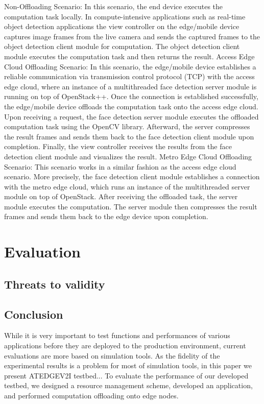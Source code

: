\documentclass[conference]{IEEEtran}
\begin{document}
Non-Offloading Scenario: In this scenario, the end device executes the computation task locally. In compute-intensive applications such as real-time object detection applications the view 
controller on the edge/mobile device captures image frames from the live camera and sends the captured frames to the object detection client module for computation. The object detection client module executes the computation task and then returns the result. 
Access Edge Cloud Offloading Scenario: In this scenario, the edge/mobile device establishes a 
reliable communication via transmission control protocol (TCP) with the access edge cloud, where 
an instance of a multithreaded face detection 
server module is running on top of OpenStack++. 
Once the connection is established successfully, 
the edge/mobile device offloads the computation 
task onto the access edge cloud. Upon receiving a request, the face detection server module 
executes the offloaded computation task using 
the OpenCV library. Afterward, the server compresses the result frames and sends them back 
to the face detection client module upon completion. Finally, the view controller receives the 
results from the face detection client module and 
visualizes the result.
Metro Edge Cloud Offloading Scenario: This 
scenario works in a similar fashion as the access 
edge cloud scenario. More precisely, the face 
detection client module establishes a connection with the metro edge cloud, which runs an 
instance of the multithreaded server module on 
top of OpenStack. After receiving the offloaded 
task, the server module executes the computation. The server module then compresses the 
result frames and sends them back to the edge 
device upon completion.


\section{Evaluation}


\subsection{Threats to validity}


\subsection{Conclusion}
\par While it is very important to test functions and performances of various applications before they are deployed to
the production environment, current evaluations are more based on simulation tools. As the fidelity of the experimental results is a problem for most of simulation tools, in this paper we present ATEDGEV2I testbed...
To evaluate the performance of our developed testbed, we designed a resource management scheme, developed an application, and performed computation offloading onto edge nodes.




\end{document}
